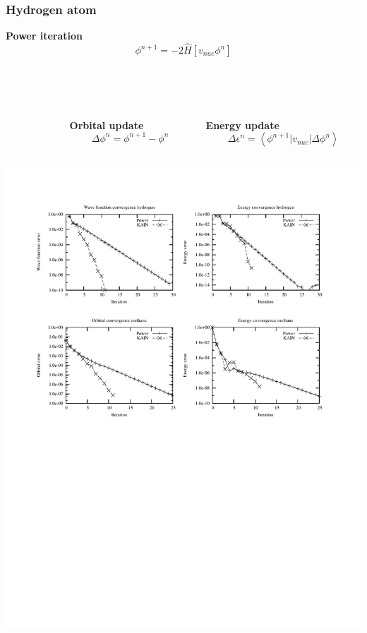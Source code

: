 \documentclass[mathserif, 8pt]{beamer}
\begin{document}
\begin{frame}
    \frametitle{Hydrogen atom}
    \centering
    \textbf{Power iteration}
    \begin{equation}
	\nonumber
	\phi^{n+1} = -2\hat{H}\left[v_{nuc}\phi^n\right]
    \end{equation}
    \ \\
    \ \\
    \ \\
    \begin{columns}
    \begin{column}{.10\textwidth}
    \ \\
    \end{column}
    \begin{column}{.40\textwidth}
    \centering
    \textbf{Orbital update}
    \begin{equation}
	\nonumber
	\Delta\phi^n = \phi^{n+1} - \phi^n
    \end{equation}
    \end{column}
    \begin{column}{.50\textwidth}
    \centering
    \textbf{Energy update}
    \begin{equation}
	\nonumber
	\Delta \epsilon^n = \left<\phi^{n+1}|v_{nuc}|\Delta\phi^n\right>
    \end{equation}
    \end{column}
    \end{columns}    
    \begin{center}
	\includegraphics[scale=0.6, clip, viewport = 50 550 540 730]{figures/convergence.pdf}
    \end{center}
\end{frame}
\end{document}
